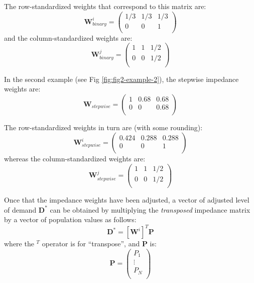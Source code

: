 \documentclass[10pt,letterpaper]{article}
\begin{document}
The row-standardized weights that correspond to this matrix are: \[
\mathbf{W}^{i}_{binary} = \left(\begin{array}{ccc}
            1/3 & 1/3 & 1/3\\
            0 & 0 & 1\\
        \end{array}
        \right)
\] and the column-standardized weights are: \[
\mathbf{W}^{j}_{binary} = \left(\begin{array}{ccc}
            1 & 1 & 1/2\\
            0 & 0 & 1/2\\
        \end{array}
        \right)
\]

In the second example (see Fig \ref{fig:fig2-example-2}), the stepwise
impedance weights are: \[
\mathbf{W}_{stepwise} = \left(\begin{array}{ccc}
            1 & 0.68 & 0.68\\
            0 & 0 & 0.68\\
        \end{array}
        \right)
\]

The row-standardized weights in turn are (with some rounding): \[
\mathbf{W}^{i}_{stepwise} = \left(\begin{array}{ccc}
            0.424 & 0.288 & 0.288\\
            0 & 0 & 1\\
        \end{array}
        \right)
\] whereas the column-standardized weights are: \[
\mathbf{W}^{j}_{stepwise} = \left(\begin{array}{ccc}
            1 & 1 & 1/2\\
            0 & 0 & 1/2\\
        \end{array}
        \right)
\]

Once that the impedance weights have been adjusted, a vector of adjusted
level of demand \(\mathbf{D}^*\) can be obtained by multiplying the
\emph{transposed} impedance matrix by a vector of population values as
follows: \[
\mathbf{D}^* = [\mathbf{W}^{i}]^T\mathbf{P}
\] where the \(^T\) operator is for ``transpose'', and \(\mathbf{P}\)
is: \[
\mathbf{P} = \left(\begin{array}{c}
            P_1\\
            \vdots\\
            P_N\\
        \end{array}
        \right) 
\]
\end{document}
